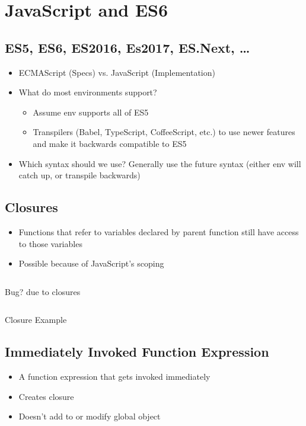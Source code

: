 \chapter{JavaScript and ES6}
\section{ES5, ES6, ES2016, Es2017, ES.Next, \dots}
\begin{itemize}
	\item ECMAScript (Specs) vs. JavaScript (Implementation)
	\item What do most environments support?
	      \begin{itemize}
		      \item Assume env supports all of ES5
		      \item Transpilers (Babel, TypeScript, CoffeeScript, etc.) to use newer
		            features and make it backwards compatible to ES5
	      \end{itemize}
	\item Which syntax should we use? Generally use the future syntax (either env will
	      catch up, or transpile backwards)
\end{itemize}

\section{Closures}
\begin{itemize}
	\item Functions that refer to variables declared by parent function still have
	      access to those variables
	\item Possible because of JavaScript's scoping
\end{itemize}

\begin{code}
	\inputminted{js}{src1/0-closureBug.js}
	\caption{Bug? due to closures}
\end{code}

\begin{code}
	\inputminted{js}{src1/1-closureExample.js}
	\caption{Closure Example}
\end{code}

\section{Immediately Invoked Function Expression}
\begin{itemize}
	\item A function expression that gets invoked immediately
	\item Creates closure
	\item Doesn’t add to or modify global object
\end{itemize}

